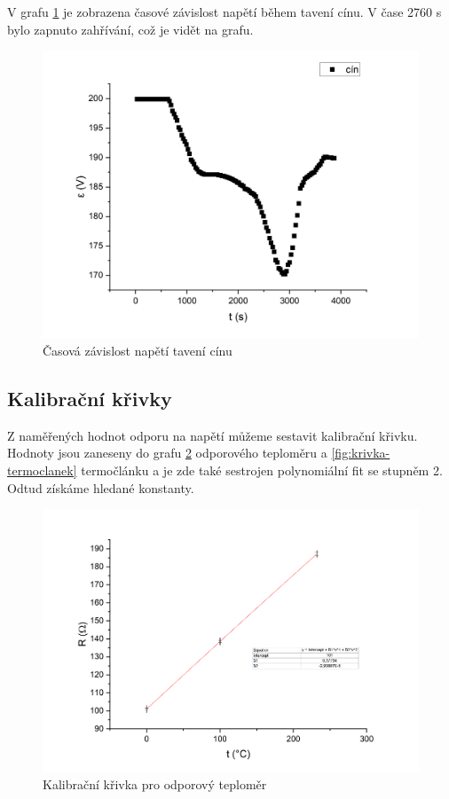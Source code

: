 V grafu \ref{fig:napeti-na-case-cin} je zobrazena časové závislost napětí během tavení cínu. V čase 2760 s bylo zapnuto zahřívání, což je vidět na grafu.

\begin{figure}[h]
    \centering
    \includegraphics[width=0.5\linewidth]{8 - Kalibrace odporového teploměru a termočlánku//Prototkol - kalibrace teploměru//img/Závislost epsilon na čase, cín.png}
    \caption{Časová závislost napětí tavení cínu}
    \label{fig:napeti-na-case-cin}
\end{figure}

\newpage
\subsection{Kalibrační křivky}
Z naměřených hodnot odporu na napětí můžeme sestavit kalibrační křivku. Hodnoty jsou zaneseny do grafu \ref{fig:krivka-odpor} odporového teploměru a \ref{fig:krivka-termoclanek} termočlánku a je zde také sestrojen polynomiální fit se stupněm 2. Odtud získáme hledané konstanty.

\begin{figure}[h]
    \centering
    \includegraphics[width=0.8\linewidth]{8 - Kalibrace odporového teploměru a termočlánku//Prototkol - kalibrace teploměru//img/Závislost R na t, parabola.png}
    \caption{Kalibrační křivka pro odporový teploměr}
    \label{fig:krivka-odpor}
\end{figure}

